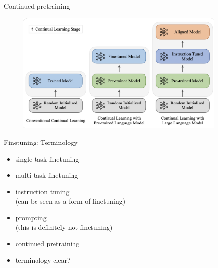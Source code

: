 \begin{frame}{Continued pretraining}

\vfill
	
	\begin{figure}
		\centering
		\includegraphics[height = 6cm]{figure/continuedpretraining2} 
	\end{figure}

\vfill

\end{frame}


\begin{frame}{Finetuning: Terminology}

\vfill

\begin{itemize}
\item single-task finetuning
\item multi-task finetuning
\item instruction tuning\\ (can be seen as a form of finetuning)
\item prompting\\
(this is definitely not finetuning)
\item continued pretraining
\item \ques terminology clear?
\end{itemize}

\vfill

\end{frame}





%
%	
%
%

